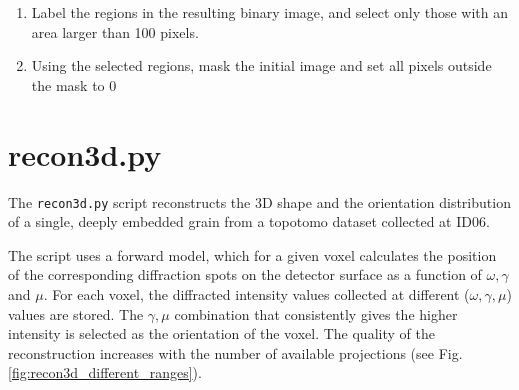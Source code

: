 \documentclass[11pt]{scrartcl}
\begin{document}
\begin{enumerate}
\begin{enumerate}
        \item Label the regions in the resulting binary image, and select only those with an area larger than 100 pixels.


        \item Using the selected regions, mask the initial image and set all pixels outside the mask to 0
    \end{enumerate}

\end{enumerate}



\section{recon3d.py}
\label{sec:recon3d}

The {\texttt{recon3d.py}} script reconstructs the {\footnotesize{3D}} shape and the orientation distribution of a single, deeply embedded grain from a topotomo dataset collected at {\footnotesize{ID06}}.

The script uses a forward model, which for a given voxel calculates the position of the corresponding diffraction spots on the detector surface as a function of $\omega, \gamma$ and $\mu$. For each voxel, the diffracted intensity values collected at different ($\omega, \gamma, \mu$) values are stored. The $\gamma, \mu$ combination that consistently gives the higher intensity is selected as the orientation of the voxel. The quality of the reconstruction increases with the number of available projections (see Fig. \ref{fig:recon3d_different_ranges}).
\end{document}
